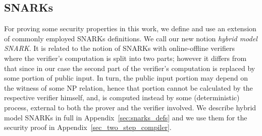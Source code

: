 \subsection{SNARKs}
\label{sec:short_snarks_defs}
\noindent For proving some security properties in this work, we define and use an extension of commonly employed SNARKs definitions. We call our new notion \emph{hybrid model SNARK}. It is related to the notion of SNARKs with online-offline verifiers~\cite{HP_paper} where the verifier's computation 
is split into two parts; however it differs from that since in our case the second part of the verifier's computation is replaced by some portion of public input. 
In turn, the public input portion may depend on the witness of some NP relation, hence that portion cannot be calculated by the respective verifier himself, and, is computed instead by some (deterministic) process, external to both the prover and the verifier involved. We describe hybrid model SNARKs in full in Appendix~\ref{sec:snarks_defs} and we use them for the security proof in Appendix~\ref{sec_two_step_compiler}.




